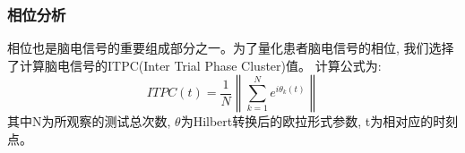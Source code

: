 %
%
%
%


\subsubsection{相位分析}
相位也是脑电信号的重要组成部分之一。为了量化患者脑电信号的相位,
我们选择了计算脑电信号的ITPC(Inter Trial Phase Cluster)值\cite{gu2010phase}。
计算公式为:
\begin{equation}
    ITPC(t) = \frac{1}{N} \left\| \sum_{k=1}^N e^{i \theta_k(t)} \right\|
\end{equation}
其中N为所观察的测试总次数, $\theta$为Hilbert转换后的欧拉形式参数, t为相对应的时刻点。


